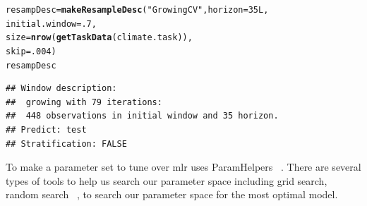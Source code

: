 \documentclass[12pt]{article}\usepackage[]{graphicx}\usepackage[]{color}
\makeatletter
\newcommand{\hlnum}[1]{\textcolor[rgb]{0.686,0.059,0.569}{#1}}%
\newcommand{\hlstr}[1]{\textcolor[rgb]{0.192,0.494,0.8}{#1}}%
\newcommand{\hlstd}[1]{\textcolor[rgb]{0.345,0.345,0.345}{#1}}%
\newcommand{\hlkwb}[1]{\textcolor[rgb]{0.69,0.353,0.396}{#1}}%
\newcommand{\hlkwc}[1]{\textcolor[rgb]{0.333,0.667,0.333}{#1}}%
\newcommand{\hlkwd}[1]{\textcolor[rgb]{0.737,0.353,0.396}{\textbf{#1}}}%
\newenvironment{kframe}{%
 \def\at@end@of@kframe{}%
 \ifinner\ifhmode%
  \def\at@end@of@kframe{\end{minipage}}%
  \begin{minipage}{\columnwidth}%
 \fi\fi%
 \def\FrameCommand##1{\hskip\@totalleftmargin \hskip-\fboxsep
 \colorbox{shadecolor}{##1}\hskip-\fboxsep
     \hskip-\linewidth \hskip-\@totalleftmargin \hskip\columnwidth}%
 \MakeFramed {\advance\hsize-\width
   \@totalleftmargin\z@ \linewidth\hsize
   \@setminipage}}%
 {\par\unskip\endMakeFramed%
 \at@end@of@kframe}
\newenvironment{knitrout}{}{} %
\theoremstyle{definition}
\newcommand{\pkg}[1]{{\fontseries{b}\selectfont #1}}
\makeatother
\begin{document}
\singlespacing
\begin{knitrout}
\color{fgcolor}\begin{kframe}
\begin{alltt}
\hlstd{resampDesc} \hlkwb{=} \hlkwd{makeResampleDesc}\hlstd{(}\hlstr{"GrowingCV"}\hlstd{,} \hlkwc{horizon} \hlstd{=} \hlnum{35L}\hlstd{,}
                               \hlkwc{initial.window} \hlstd{=} \hlnum{.7}\hlstd{,}
                               \hlkwc{size} \hlstd{=} \hlkwd{nrow}\hlstd{(}\hlkwd{getTaskData}\hlstd{(climate.task)),}
                               \hlkwc{skip} \hlstd{=} \hlnum{.004}\hlstd{)}
\hlstd{resampDesc}
\end{alltt}
\begin{verbatim}
## Window description:
##  growing with 79 iterations:
##  448 observations in initial window and 35 horizon.
## Predict: test
## Stratification: FALSE
\end{verbatim}
\end{kframe}
\end{knitrout}
\doublespacing


To make a parameter set to tune over \pkg{mlr} uses \pkg{ParamHelpers} ~\cite{paramhelper}. There are several types of tools to help us search our parameter space including grid search, random search ~\cite{Bergstra}, to search our parameter space for the most optimal model.
\end{document}
